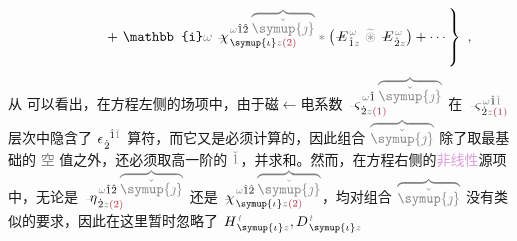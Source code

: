 \begin{subequations}
\begin{align}
	&~~~~~~~~~~~~~~~ +\left. \mathbb{i} \mathcolor{gray}{\omega} ~\Xint{{}^{}_{\mathcolor{gray}{-}}}{23}{\chi}^{\;\! \mathcolor{gray}{\omega} \hat{1} \hat{2} \;\! \mathcolor{gray}{\overbrace{\check{\symup{\jmath}}}}}_{\;\! \symup{\iota} \mathcolor{gray}{z} \textcolor{Maroon}{(2)}} \mathcolor{gray}{*} \left( \Xint{\mathcolor{gray}{-}}{295}{E}^{\;\!\mathcolor{gray}{\omega}}_{\;\! \hat{1} \mathcolor{gray}{z}} ~\mathcolor{gray}{\widetilde \circledast}~ \Xint{\mathcolor{gray}{-}}{295}{E}^{\;\!\mathcolor{gray}{\omega}}_{\;\! \hat{2} \mathcolor{gray}{z}} \right) + \cdots \right\}~,
\end{align}
\end{subequations}
\clearpage
从  可以看出，在方程左侧的场项中，由于\textcolor{NavyBlue}{磁$\longleftarrow$电}系数 $\Xint{\begin{smallmatrix} ~ \\ {}^{}_{\mathcolor{gray}{-}} \\ ~ \end{smallmatrix}}{13}{\varsigma}^{\;\! \mathcolor{gray}{\omega} \hat{1} \;\! \mathcolor{gray}{\overbrace{\check{\symup{\jmath}}}}}_{\;\! \dot{2} \mathcolor{gray}{z} \textcolor{Maroon}{(1)}}$ 在 $\Xint{\begin{smallmatrix} ~ \\ {}^{}_{\mathcolor{gray}{-}} \\ ~ \end{smallmatrix}}{13}{\varsigma}^{\;\! \mathcolor{gray}{\omega} \hat{1} \mathcolor{gray}{\check{1}}}_{\;\! \dot{2} \mathcolor{gray}{z} \textcolor{Maroon}{(1)}}$ 层次中隐含了 $\epsilon^{\;\! \hphantom{\dot{2}} \hat{1} \mathcolor{gray}{\check{1}}}_{\;\! \dot{2}}$ 算符，而它又是必须计算的，因此组合 $\mathcolor{gray}{\overbrace{\check{\symup{\jmath}}}}$ 除了取最基础的 \textcolor{gray}{空} 值之外，还必须取高一阶的 $\mathcolor{gray}{\check{1}}$，并求和。然而，在方程右侧的\textcolor{Plum}{非线性}源项中，无论是 $\Xint{\begin{smallmatrix} ~ \\ {}^{}_{\mathcolor{gray}{-}} \\ ~ \end{smallmatrix}}{17}{\eta}^{\;\! \mathcolor{gray}{\omega} \hat{1} \hat{2} \;\! \mathcolor{gray}{\overbrace{\check{\symup{\jmath}}}}}_{\;\! \dot{2} \mathcolor{gray}{z} \textcolor{Maroon}{(2)}}$ 还是 $\Xint{{}^{}_{\mathcolor{gray}{-}}}{23}{\chi}^{\;\! \mathcolor{gray}{\omega} \hat{1} \hat{2} \;\! \mathcolor{gray}{\overbrace{\check{\symup{\jmath}}}}}_{\;\! \symup{\iota} \mathcolor{gray}{z} \textcolor{Maroon}{(2)}}$，均对组合 $\mathcolor{gray}{\overbrace{\check{\symup{\jmath}}}}$ 没有类似的要求，因此在这里暂时忽略了 $H^{\;\!\mathcolor{gray}{t}}_{\;\! \symup{\iota}\mathcolor{gray}{z}}, D^{\;\!\mathcolor{gray}{t}}_{\;\! \symup{\iota}\mathcolor{gray}{z}}$ 